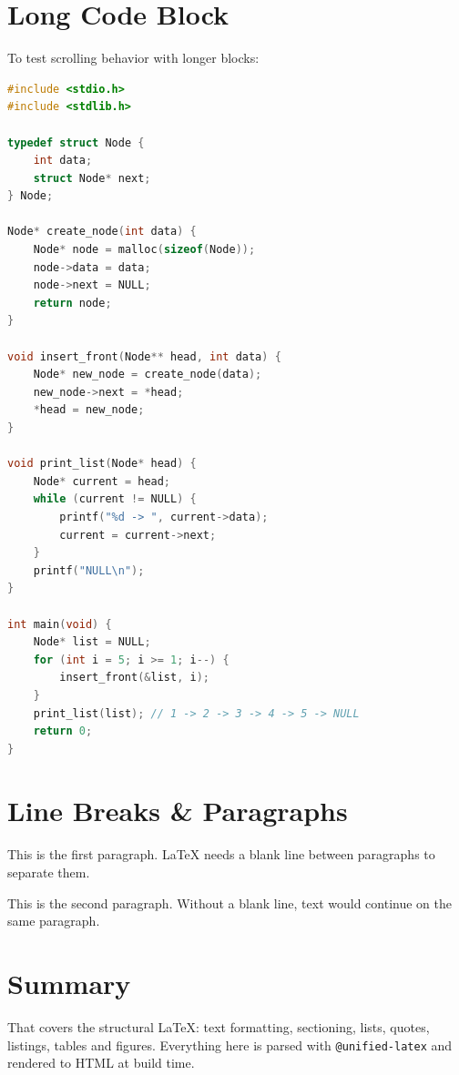 \section{Long Code Block}

To test scrolling behavior with longer blocks:

\begin{lstlisting}[language=c]
#include <stdio.h>
#include <stdlib.h>

typedef struct Node {
    int data;
    struct Node* next;
} Node;

Node* create_node(int data) {
    Node* node = malloc(sizeof(Node));
    node->data = data;
    node->next = NULL;
    return node;
}

void insert_front(Node** head, int data) {
    Node* new_node = create_node(data);
    new_node->next = *head;
    *head = new_node;
}

void print_list(Node* head) {
    Node* current = head;
    while (current != NULL) {
        printf("%d -> ", current->data);
        current = current->next;
    }
    printf("NULL\n");
}

int main(void) {
    Node* list = NULL;
    for (int i = 5; i >= 1; i--) {
        insert_front(&list, i);
    }
    print_list(list); // 1 -> 2 -> 3 -> 4 -> 5 -> NULL
    return 0;
}
\end{lstlisting}

\section{Line Breaks \& Paragraphs}

This is the first paragraph. LaTeX needs a blank line between paragraphs to separate them.

This is the second paragraph. Without a blank line, text would continue on the same paragraph.

\section{Summary}

That covers the structural LaTeX: text formatting, sectioning, lists, quotes, listings, tables and figures. Everything here is parsed with \texttt{@unified-latex} and rendered to HTML at build time.



